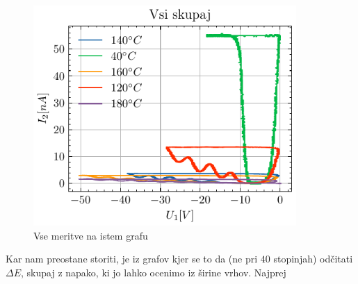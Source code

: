 \documentclass[10pt]{article}
\begin{document}
\begin{figure}[ht]
    \begin{center}
        \includegraphics[width=10cm]{vsi.pdf}
        \caption{Vse meritve na istem grafu}
        \label{vsi}
    \end{center}
\end{figure}


Kar nam preostane storiti, je iz grafov kjer se to da (ne pri $40$ stopinjah) odčitati $\Delta E$, skupaj z napako, ki jo lahko ocenimo iz širine vrhov. Najprej 
\end{document}
